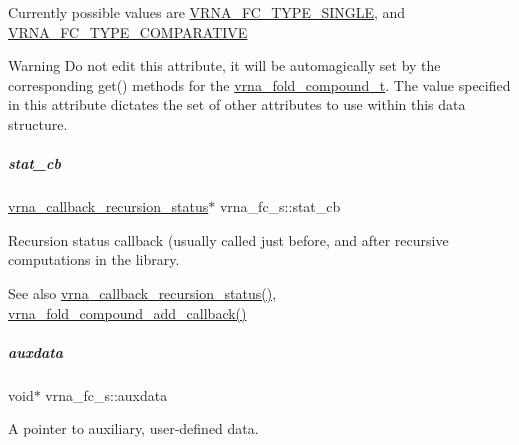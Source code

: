 Currently possible values are \hyperlink{group__fold__compound_gga01a4ff86fa71deaaa5d1abbd95a1447da7e264dd3cf2dc9b6448caabcb7763cd6}{V\+R\+N\+A\+\_\+\+F\+C\+\_\+\+T\+Y\+P\+E\+\_\+\+S\+I\+N\+G\+LE}, and \hyperlink{group__fold__compound_gga01a4ff86fa71deaaa5d1abbd95a1447dab821ce46ea3cf665be97df22a76f5023}{V\+R\+N\+A\+\_\+\+F\+C\+\_\+\+T\+Y\+P\+E\+\_\+\+C\+O\+M\+P\+A\+R\+A\+T\+I\+VE} \begin{DoxyWarning}{Warning}
Do not edit this attribute, it will be automagically set by the corresponding get() methods for the \hyperlink{group__fold__compound_ga1b0cef17fd40466cef5968eaeeff6166}{vrna\+\_\+fold\+\_\+compound\+\_\+t}. The value specified in this attribute dictates the set of other attributes to use within this data structure. 
\end{DoxyWarning}
\mbox{\label{group__fold__compound_a87a83f6795b569000efcbe65acc3dd81}} 
\subparagraph{\texorpdfstring{stat\+\_\+cb}{stat\_cb}}
{\footnotesize\ttfamily \hyperlink{group__fold__compound_gac86036fa8cad1108832335063243cdc8}{vrna\+\_\+callback\+\_\+recursion\+\_\+status}$\ast$ vrna\+\_\+fc\+\_\+s\+::stat\+\_\+cb}



Recursion status callback (usually called just before, and after recursive computations in the library. 

\begin{DoxySeeAlso}{See also}
\hyperlink{group__fold__compound_gac86036fa8cad1108832335063243cdc8}{vrna\+\_\+callback\+\_\+recursion\+\_\+status()}, \hyperlink{group__fold__compound_ga097ed6133055624667cbce8cfdebf82d}{vrna\+\_\+fold\+\_\+compound\+\_\+add\+\_\+callback()} 
\end{DoxySeeAlso}
\mbox{\label{group__fold__compound_a20048e0c369e9f24b55423d600037c68}} 
\subparagraph{\texorpdfstring{auxdata}{auxdata}}
{\footnotesize\ttfamily void$\ast$ vrna\+\_\+fc\+\_\+s\+::auxdata}



A pointer to auxiliary, user-\/defined data. 

